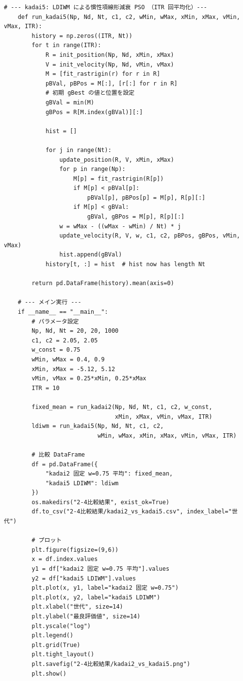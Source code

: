 \begin{lstlisting}[caption=固定慣性項と LDIWM の収束曲線比較実験コード, label=lst:kadai2_code]
    # --- kadai5: LDIWM による慣性項線形減衰 PSO （ITR 回平均化）---
    def run_kadai5(Np, Nd, Nt, c1, c2, wMin, wMax, xMin, xMax, vMin, vMax, ITR):
        history = np.zeros((ITR, Nt))
        for t in range(ITR):
            R = init_position(Np, Nd, xMin, xMax)
            V = init_velocity(Np, Nd, vMin, vMax)
            M = [fit_rastrigin(r) for r in R]
            pBVal, pBPos = M[:], [r[:] for r in R]
            # 初期 gBest の値と位置を設定
            gBVal = min(M)
            gBPos = R[M.index(gBVal)][:]
    
            hist = []
    
            for j in range(Nt):
                update_position(R, V, xMin, xMax)
                for p in range(Np):
                    M[p] = fit_rastrigin(R[p])
                    if M[p] < pBVal[p]:
                        pBVal[p], pBPos[p] = M[p], R[p][:]
                    if M[p] < gBVal:
                        gBVal, gBPos = M[p], R[p][:]
                w = wMax - ((wMax - wMin) / Nt) * j
                update_velocity(R, V, w, c1, c2, pBPos, gBPos, vMin, vMax)
                hist.append(gBVal)
            history[t, :] = hist  # hist now has length Nt
    
        return pd.DataFrame(history).mean(axis=0)
    
    # --- メイン実行 ---
    if __name__ == "__main__":
        # パラメータ設定
        Np, Nd, Nt = 20, 20, 1000
        c1, c2 = 2.05, 2.05
        w_const = 0.75
        wMin, wMax = 0.4, 0.9
        xMin, xMax = -5.12, 5.12
        vMin, vMax = 0.25*xMin, 0.25*xMax
        ITR = 10
    
        fixed_mean = run_kadai2(Np, Nd, Nt, c1, c2, w_const,
                                xMin, xMax, vMin, vMax, ITR)
        ldiwm = run_kadai5(Np, Nd, Nt, c1, c2,
                           wMin, wMax, xMin, xMax, vMin, vMax, ITR)
    
        # 比較 DataFrame
        df = pd.DataFrame({
            "kadai2 固定 w=0.75 平均": fixed_mean,
            "kadai5 LDIWM": ldiwm
        })
        os.makedirs("2-4比較結果", exist_ok=True)
        df.to_csv("2-4比較結果/kadai2_vs_kadai5.csv", index_label="世代")
    
        # プロット
        plt.figure(figsize=(9,6))
        x = df.index.values
        y1 = df["kadai2 固定 w=0.75 平均"].values
        y2 = df["kadai5 LDIWM"].values
        plt.plot(x, y1, label="kadai2 固定 w=0.75")
        plt.plot(x, y2, label="kadai5 LDIWM")
        plt.xlabel("世代", size=14)
        plt.ylabel("最良評価値", size=14)
        plt.yscale("log")
        plt.legend()
        plt.grid(True)
        plt.tight_layout()
        plt.savefig("2-4比較結果/kadai2_vs_kadai5.png")
        plt.show()
\end{lstlisting}

